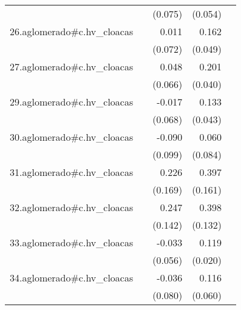 {\begin{longtable}{l*{4}{D{.}{.}{-1}}}
            &                     &     (0.075)         &     (0.054)         &                     \\
\addlinespace
26.aglomerado#c.hv\_cloacas&                     &       0.011         &       0.162\sym{**} &                     \\
            &                     &     (0.072)         &     (0.049)         &                     \\
\addlinespace
27.aglomerado#c.hv\_cloacas&                     &       0.048         &       0.201\sym{***}&                     \\
            &                     &     (0.066)         &     (0.040)         &                     \\
\addlinespace
29.aglomerado#c.hv\_cloacas&                     &      -0.017         &       0.133\sym{**} &                     \\
            &                     &     (0.068)         &     (0.043)         &                     \\
\addlinespace
30.aglomerado#c.hv\_cloacas&                     &      -0.090         &       0.060         &                     \\
            &                     &     (0.099)         &     (0.084)         &                     \\
\addlinespace
31.aglomerado#c.hv\_cloacas&                     &       0.226         &       0.397\sym{*}  &                     \\
            &                     &     (0.169)         &     (0.161)         &                     \\
\addlinespace
32.aglomerado#c.hv\_cloacas&                     &       0.247         &       0.398\sym{**} &                     \\
            &                     &     (0.142)         &     (0.132)         &                     \\
\addlinespace
33.aglomerado#c.hv\_cloacas&                     &      -0.033         &       0.119\sym{***}&                     \\
            &                     &     (0.056)         &     (0.020)         &                     \\
\addlinespace
34.aglomerado#c.hv\_cloacas&                     &      -0.036         &       0.116         &                     \\
            &                     &     (0.080)         &     (0.060)         &                     \\

\end{longtable}}
